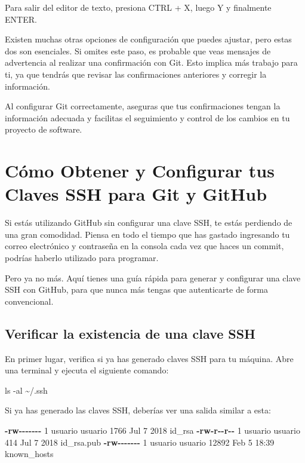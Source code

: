 \documentclass[
  a4paper,
]{article}
\newenvironment{Shaded}{}{}
\newcommand{\AttributeTok}[1]{\textcolor[rgb]{0.84,0.23,0.29}{#1}}
\newcommand{\ExtensionTok}[1]{\textcolor[rgb]{0.84,0.23,0.29}{\textbf{#1}}}
\newcommand{\FunctionTok}[1]{\textcolor[rgb]{0.44,0.26,0.76}{#1}}
\newcommand{\NormalTok}[1]{\textcolor[rgb]{0.14,0.16,0.18}{#1}}
\begin{document}
Para salir del editor de texto, presiona CTRL + X, luego Y y finalmente
ENTER.

Existen muchas otras opciones de configuración que puedes ajustar, pero
estas dos son esenciales. Si omites este paso, es probable que veas
mensajes de advertencia al realizar una confirmación con Git. Esto
implica más trabajo para ti, ya que tendrás que revisar las
confirmaciones anteriores y corregir la información.

Al configurar Git correctamente, aseguras que tus confirmaciones tengan
la información adecuada y facilitas el seguimiento y control de los
cambios en tu proyecto de software.

\section{Cómo Obtener y Configurar tus Claves SSH para Git y
GitHub}\label{cuxf3mo-obtener-y-configurar-tus-claves-ssh-para-git-y-github}

Si estás utilizando GitHub sin configurar una clave SSH, te estás
perdiendo de una gran comodidad. Piensa en todo el tiempo que has
gastado ingresando tu correo electrónico y contraseña en la consola cada
vez que haces un commit, podrías haberlo utilizado para programar.

Pero ya no más. Aquí tienes una guía rápida para generar y configurar
una clave SSH con GitHub, para que nunca más tengas que autenticarte de
forma convencional.

\subsection{Verificar la existencia de una clave
SSH}\label{verificar-la-existencia-de-una-clave-ssh}

En primer lugar, verifica si ya has generado claves SSH para tu máquina.
Abre una terminal y ejecuta el siguiente comando:

\begin{Shaded}
\begin{Highlighting}[]
\FunctionTok{ls} \AttributeTok{{-}al}\NormalTok{ \textasciitilde{}/.ssh}
\end{Highlighting}
\end{Shaded}

Si ya has generado las claves SSH, deberías ver una salida similar a
esta:

\begin{Shaded}
\begin{Highlighting}[]
\ExtensionTok{{-}rw{-}{-}{-}{-}{-}{-}{-}}\NormalTok{  1 usuario usuario  1766 Jul  7  2018 id\_rsa}
\ExtensionTok{{-}rw{-}r{-}{-}r{-}{-}}\NormalTok{  1 usuario usuario   414 Jul  7  2018 id\_rsa.pub}
\ExtensionTok{{-}rw{-}{-}{-}{-}{-}{-}{-}}\NormalTok{  1 usuario usuario 12892 Feb  5 18:39 known\_hosts}
\end{Highlighting}
\end{Shaded}
\end{document}
